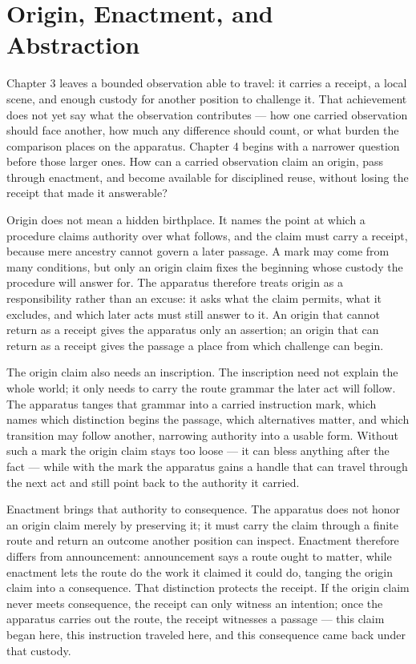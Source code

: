 \section{Origin, Enactment, and Abstraction}

Chapter 3 leaves a bounded observation able to travel: it carries a receipt, a local scene, and enough custody for another position to challenge it. That achievement does not yet say what the observation contributes --- how one carried observation should face another, how much any difference should count, or what burden the comparison places on the apparatus. Chapter 4 begins with a narrower question before those larger ones. How can a carried observation claim an origin, pass through enactment, and become available for disciplined reuse, without losing the receipt that made it answerable?

Origin does not mean a hidden birthplace. It names the point at which a procedure claims authority over what follows, and the claim must carry a receipt, because mere ancestry cannot govern a later passage. A mark may come from many conditions, but only an origin claim fixes the beginning whose custody the procedure will answer for. The apparatus therefore treats origin as a responsibility rather than an excuse: it asks what the claim permits, what it excludes, and which later acts must still answer to it. An origin that cannot return as a receipt gives the apparatus only an assertion; an origin that can return as a receipt gives the passage a place from which challenge can begin.

The origin claim also needs an inscription. The inscription need not explain the whole world; it only needs to carry the route grammar the later act will follow. The apparatus tanges that grammar into a carried instruction mark, which names which distinction begins the passage, which alternatives matter, and which transition may follow another, narrowing authority into a usable form. Without such a mark the origin claim stays too loose --- it can bless anything after the fact --- while with the mark the apparatus gains a handle that can travel through the next act and still point back to the authority it carried.

Enactment brings that authority to consequence. The apparatus does not honor an origin claim merely by preserving it; it must carry the claim through a finite route and return an outcome another position can inspect. Enactment therefore differs from announcement: announcement says a route ought to matter, while enactment lets the route do the work it claimed it could do, tanging the origin claim into a consequence. That distinction protects the receipt. If the origin claim never meets consequence, the receipt can only witness an intention; once the apparatus carries out the route, the receipt witnesses a passage --- this claim began here, this instruction traveled here, and this consequence came back under that custody.

